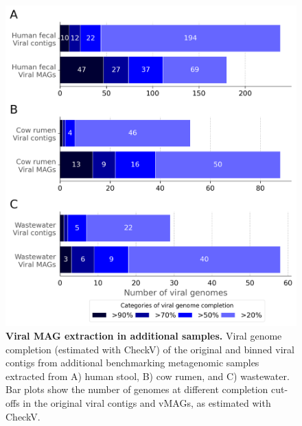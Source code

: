 \begin{figure}[!t]
    \centering
    \includegraphics[width=1\linewidth]{Figures/figure_extra_samples_binning.png}
    \caption{\textbf{Viral MAG extraction in additional samples.} Viral genome completion (estimated with CheckV) of the original and binned viral contigs from additional benchmarking metagenomic samples extracted from A) human stool, B) cow rumen, and C) wastewater. Bar plots show the number of genomes at different completion cut-offs in the original viral contigs and vMAGs, as estimated with CheckV.}
    \label{fig:figure_extra_samples_binning}
 \end{figure}


